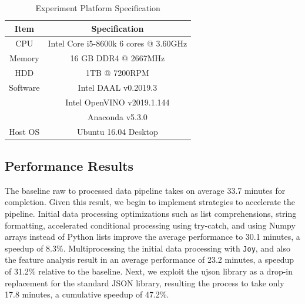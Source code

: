\begin{table}[h!]
\scriptsize
\centering
\caption{Experiment Platform Specification}
\begin{tabular}{|c|c|}
  \hline
  Item  & Specification \\
  \hline\hline
  CPU &  Intel Core i5-8600k 6 cores @ 3.60GHz\\
  \hline
  Memory & 16 GB DDR4 @ 2667MHz\\
  \hline
  HDD & 1TB @ 7200RPM\\
  \hline
  Software & Intel DAAL v0.2019.3\\
  \hline
  & Intel OpenVINO v2019.1.144\\
  \hline
  & Anaconda v5.3.0 \\
  \hline
  Host OS & Ubuntu 16.04 Desktop\\
  \hline
\end{tabular}
\label{tbl:platform}
\end{table}

\subsection{Performance Results}
The baseline raw to processed data pipeline takes on average 33.7 minutes for completion. Given this result, we begin to implement strategies to accelerate the pipeline. Initial data processing optimizations such as list comprehensions, string formatting, accelerated conditional processing using try-catch, and using Numpy arrays instead of Python lists improve the average performance to 30.1 minutes, a speedup of 8.3\%. Multiprocessing the initial data processing with \texttt{Joy}, and also the feature analysis result in an average performance of 23.2 minutes, a speedup of 31.2\% relative to the baseline. Next, we exploit the ujson library as a drop-in replacement for the standard JSON library, resulting the process to take only 17.8 minutes, a cumulative speedup of 47.2\%.

